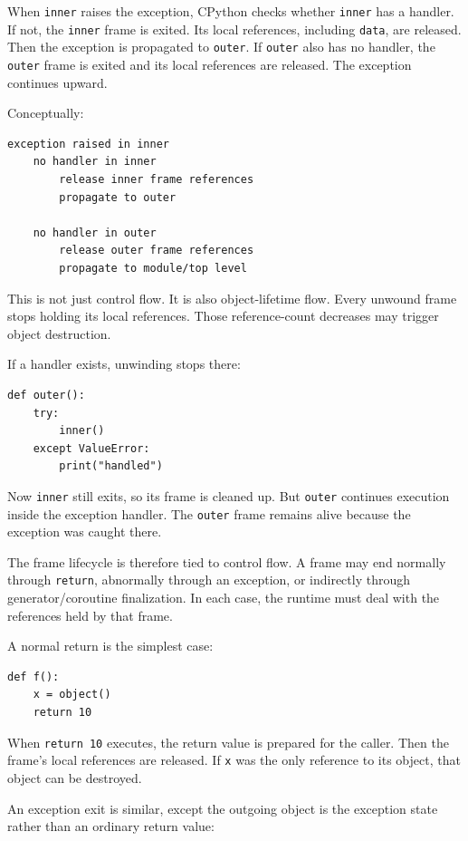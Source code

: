 When \texttt{inner} raises the exception, CPython checks whether \texttt{inner} has a handler. If not, the \texttt{inner} frame is exited. Its local references, including \texttt{data}, are released. Then the exception is propagated to \texttt{outer}. If \texttt{outer} also has no handler, the \texttt{outer} frame is exited and its local references are released. The exception continues upward.

Conceptually:

\begin{verbatim}
exception raised in inner
    no handler in inner
        release inner frame references
        propagate to outer

    no handler in outer
        release outer frame references
        propagate to module/top level
\end{verbatim}

This is not just control flow. It is also object-lifetime flow. Every unwound frame stops holding its local references. Those reference-count decreases may trigger object destruction.

If a handler exists, unwinding stops there:

\begin{verbatim}
def outer():
    try:
        inner()
    except ValueError:
        print("handled")
\end{verbatim}

Now \texttt{inner} still exits, so its frame is cleaned up. But \texttt{outer} continues execution inside the exception handler. The \texttt{outer} frame remains alive because the exception was caught there.

The frame lifecycle is therefore tied to control flow. A frame may end normally through \texttt{return}, abnormally through an exception, or indirectly through generator/coroutine finalization. In each case, the runtime must deal with the references held by that frame.

A normal return is the simplest case:

\begin{verbatim}
def f():
    x = object()
    return 10
\end{verbatim}

When \texttt{return 10} executes, the return value is prepared for the caller. Then the frame's local references are released. If \texttt{x} was the only reference to its object, that object can be destroyed.

An exception exit is similar, except the outgoing object is the exception state rather than an ordinary return value:

